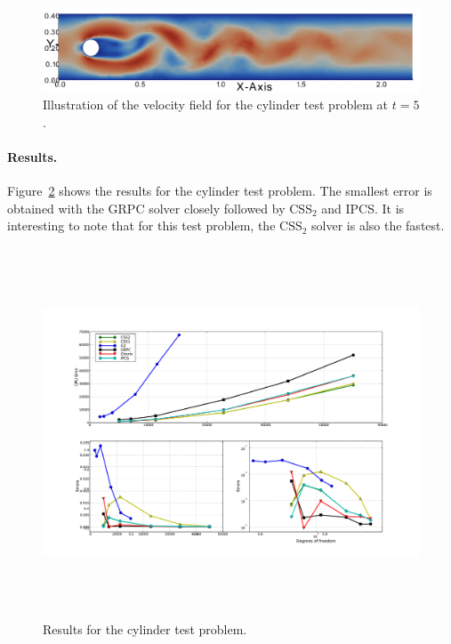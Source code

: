 \begin{figure}
  \center\includegraphics[width=\fullfig]{chapters/kvs-1/pdf/cylinderandgeoattime5nr2.pdf}
  \caption{Illustration of the velocity field for the cylinder test problem at $t = 5$.}
  \label{fig:cylinder_illustration}
\end{figure}

\vspace{1cm}


\paragraph{Results.}

Figure~\ref{fig:cylinder_res} shows the results for the cylinder test
problem. The smallest error is obtained with the GRPC solver closely
followed by $\mathrm{CSS}_2$ and IPCS. It is interesting to note that
for this test problem, the $\mathrm{CSS}_2$ solver is also the
fastest.

\begin{figure}
  \hspace{-2cm}
  \includegraphics[width=20cm,height=11cm,keepaspectratio=false]{chapters/kvs-1/pdf/new_cylinder_res.pdf}
  \caption{Results for the cylinder test problem.}
  \label{fig:cylinder_res}
\end{figure}

